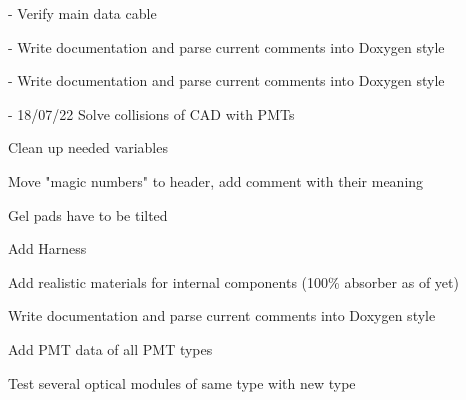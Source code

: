 \begin{DoxyRefList}
\item[Member \doxylink{class_l_o_m18_harness_a800da6699b505a8a1e1d51137f2c9e7b}{LOM18\+Harness\+::LOM18\+Harness} (\doxylink{class_l_o_m18}{LOM18} \texorpdfstring{$\ast$}{*}p\+LOM18)]\label{todo__todo000008}%
%
-\/ Verify main data cable  
\item[Member \doxylink{classm_d_o_m_afd95205edb92f86b5c8d4e5642a58e3c}{m\+DOM\+::\texorpdfstring{$\sim$}{\string~}m\+DOM} ()]\label{todo__todo000009}%
%
-\/ Write documentation and parse current comments into Doxygen style  
\item[Member \doxylink{classm_d_o_m_harness_ad83b869a9aa373be038889f61608d3c6}{m\+DOMHarness\+::m\+DOMHarness} (\doxylink{classm_d_o_m}{m\+DOM} \texorpdfstring{$\ast$}{*}p\+MDOM)]\label{todo__todo000010}%
%
-\/ Write documentation and parse current comments into Doxygen style  
\item[File \doxylink{_o_m_sim_l_o_m18_8cc}{OMSim\+LOM18.cc} ]\label{todo__todo000007}%
%
-\/ 18/07/22 Solve collisions of CAD with PMTs
\begin{DoxyItemize}
\item Clean up needed variables
\item Move "{}magic numbers"{} to header, add comment with their meaning
\item Gel pads have to be tilted
\item Add Harness
\item Add realistic materials for internal components (100\% absorber as of yet)
\item Write documentation and parse current comments into Doxygen style  
\end{DoxyItemize}
\item[Member \doxylink{class_o_m_sim_p_m_t_response_a80b379bc78ca06d23011703aae3341d7}{OMSim\+PMTResponse\+::OMSim\+PMTResponse} ()]\label{todo__todo000001}%
%
Add PMT data of all PMT types  
\item[Member \doxylink{class_o_m_sim_sensitive_detector_a8a0377d3ae13a48c1b3b08cd56bfaa08}{OMSim\+Sensitive\+Detector\+::m\+\_\+boundary\+Process} ]\label{todo__todo000002}%
%
Test several optical modules of same type with new type 
\end{DoxyRefList}